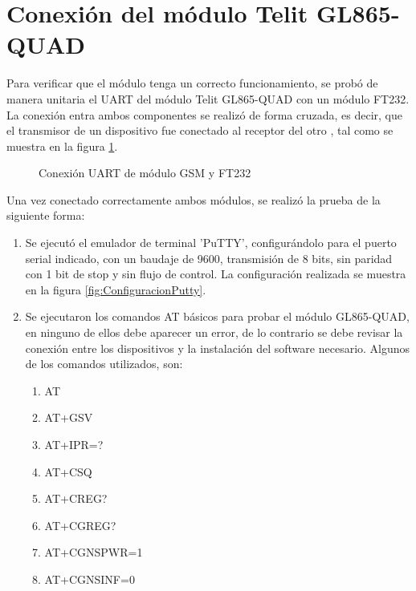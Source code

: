 \section{Conexión del módulo Telit GL865-QUAD}
Para verificar que el módulo tenga un correcto funcionamiento, se probó de manera unitaria el UART del módulo Telit GL865-QUAD con un módulo FT232. La conexión entra ambos componentes se realizó de forma cruzada, es decir, que el transmisor de un dispositivo fue conectado al receptor del otro , tal como se muestra en la figura \ref{fig:ConexionUART}.

	\begin{figure}[htbp!]
		\centering
		\caption{Conexión UART de módulo GSM y FT232}
		\label{fig:ConexionUART}
	\end{figure}
	
Una vez conectado correctamente ambos módulos, se realizó la prueba de la siguiente forma:
\begin{enumerate}
	\item Se ejecutó el emulador de terminal ’PuTTY’, configurándolo para el puerto serial
	indicado, con un baudaje de 9600, transmisión de 8 bits, sin paridad con 1 bit de
	stop y sin flujo de control. La configuración realizada se muestra en la figura \ref{fig:ConfiguracionPutty}.
	\item Se ejecutaron los comandos AT básicos para probar el módulo GL865-QUAD, en ninguno de ellos
	debe aparecer un error, de lo contrario se debe revisar la conexión entre los dispositivos
	y la instalación del software necesario. Algunos de los comandos utilizados, son:
		\begin{enumerate}
			\item AT
			\item AT+GSV
			\item AT+IPR=?
			\item AT+CSQ
			\item AT+CREG? 
			\item AT+CGREG? 
			\item AT+CGNSPWR=1
			\item AT+CGNSINF=0
		\end{enumerate}	
\end{enumerate}
 
